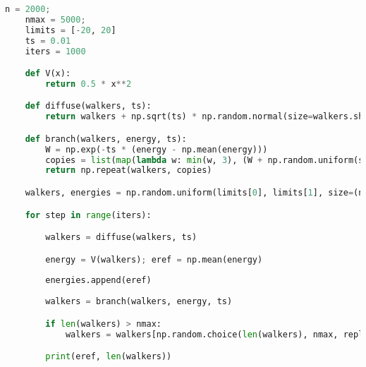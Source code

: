 \raggedbottom\begin{lstlisting}[language=Python, caption={DMC exercise code solution.}, label=code:dmc_solution]
    n = 2000;
    nmax = 5000;
    limits = [-20, 20]
    ts = 0.01
    iters = 1000

    def V(x):
        return 0.5 * x**2

    def diffuse(walkers, ts):
        return walkers + np.sqrt(ts) * np.random.normal(size=walkers.shape)

    def branch(walkers, energy, ts):
        W = np.exp(-ts * (energy - np.mean(energy)))
        copies = list(map(lambda w: min(w, 3), (W + np.random.uniform(size=walkers.shape)).astype(int)))
        return np.repeat(walkers, copies)

    walkers, energies = np.random.uniform(limits[0], limits[1], size=(n)), []

    for step in range(iters):

        walkers = diffuse(walkers, ts)

        energy = V(walkers); eref = np.mean(energy)
        
        energies.append(eref)
        
        walkers = branch(walkers, energy, ts)

        if len(walkers) > nmax:
            walkers = walkers[np.random.choice(len(walkers), nmax, replace=False)]

        print(eref, len(walkers))
\end{lstlisting}